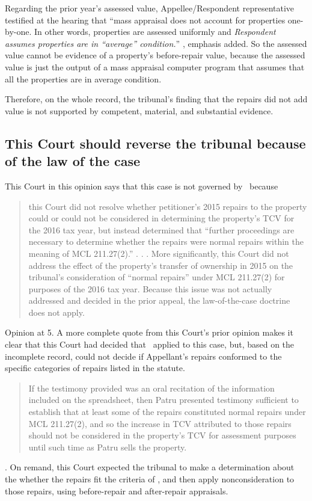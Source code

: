 \documentclass[12pt,\documentclassflag]{michiganCourtOfAppealsBrief}
\begin{document}
Regarding the prior year's assessed value, Appellee/Respondent representative testified at the hearing that ``mass appraisal does not account for properties one-by-one. In other words, properties are assessed uniformly and \emph{Respondent assumes properties are in ``average'' condition.}'' \foj[4], emphasis added. So the assessed value cannot be evidence of a property's before-repair value, because the assessed value is just the output of a mass appraisal computer program that assumes that all the properties are in average condition.

Therefore, on the whole record, the tribunal's finding that the repairs did not add value is not supported by competent, material, and substantial evidence.

\subsection{This Court should reverse the tribunal because of the law of the case}

This Court in this opinion says that this case is not governed by \cite[s]{Patru 1}\ because

\begin{quote}
  this Court did not resolve whether petitioner's 2015 repairs to the property could or could not be considered in determining the property's TCV for the 2016 tax year, but instead
determined that ``further proceedings are necessary to determine whether the repairs were normal
repairs within the meaning of MCL 211.27(2).'' . . . More significantly, this Court
did not address the effect of the property's transfer of ownership in 2015 on the tribunal's
consideration of ``normal repairs'' under MCL 211.27(2) for purposes of the 2016 tax year.
Because this issue was not actually addressed and decided in the prior appeal, the law-of-the-case
doctrine does not apply.
\end{quote}
Opinion at 5.
A more complete quote from this Court's prior opinion
makes it clear that this Court had decided that \mathieuGast\ applied to this case, but, based on the incomplete record, could not decide if Appellant's repairs conformed to the specific categories of repairs listed in the statute.

\begin{quote}
  If the testimony provided was an oral recitation of the
information included on the spreadsheet, then Patru presented testimony sufficient to establish
that at least some of the repairs constituted normal repairs under MCL 211.27(2), and so the
increase in TCV attributed to those repairs should not be considered in the property's TCV for
assessment purposes until such time as Patru sells the property.
\end{quote}
. On remand, this Court expected the tribunal to make a determination about the whether the repairs fit the criteria of \mathieuGast, and then apply nonconsideration to those repairs, using before-repair and after-repair appraisals.
\end{document}
